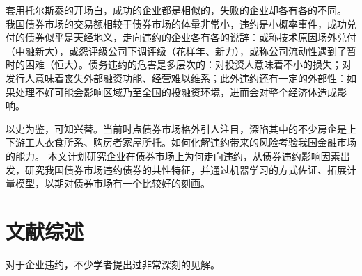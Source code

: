 套用托尔斯泰的开场白，成功的企业都是相似的，失败的企业却各有各的不同。
我国债券市场的交易额相较于债券市场的体量非常小，违约是小概率事件，成功兑付的债券似乎是天经地义，走向违约的企业各有各的说辞：或称技术原因场外兑付（中融新大），或怨评级公司下调评级（花样年、新力），或称公司流动性遇到了暂时的困难（恒大）。债务违约的危害是多层次的：对投资人意味着不小的损失；对发行人意味着丧失外部融资功能、经营难以维系；此外违约还有一定的外部性：如果处理不好可能会影响区域乃至全国的投融资环境，进而会对整个经济体造成影响。

以史为鉴，可知兴替。当前时点债券市场格外引人注目，深陷其中的不少房企是上下游工人衣食所系、购房者家屋所托。如何化解违约带来的风险考验我国金融市场的能力。
本文计划研究企业在债券市场上为何走向违约，从债券违约影响因素出发，研究我国债券市场违约债券的共性特征，并通过机器学习的方式佐证、拓展计量模型，以期对债券市场有一个比较好的刻画。

\section{文献综述}
\label{sec:zs}
对于企业违约，不少学者提出过非常深刻的见解。


